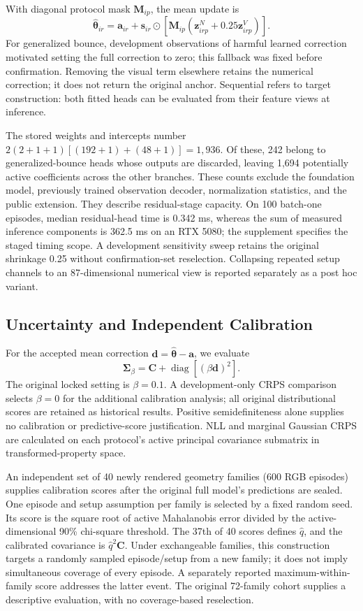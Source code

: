 \documentclass{ieeeaccess}
\begin{document}
With diagonal protocol mask $\bm M_{ip}$, the mean update is
\begin{equation}
\hat{\bm\theta}_{ir}=\bm a_{ir}+\bm s_{ir}\odot\left[\bm M_{ip}(\bm z^N_{irp}+0.25\bm z^V_{irp})\right].\label{eq:update}
\end{equation}
For generalized bounce, development observations of harmful learned correction motivated setting the full correction to zero; this fallback was fixed before confirmation. Removing the visual term elsewhere retains the numerical correction; it does not return the original anchor. Sequential refers to target construction: both fitted heads can be evaluated from their feature views at inference.

The stored weights and intercepts number $2(2+1+1)[(192+1)+(48+1)]=1,936$. Of these, 242 belong to generalized-bounce heads whose outputs are discarded, leaving 1,694 potentially active coefficients across the other branches. These counts exclude the foundation model, previously trained observation decoder, normalization statistics, and the public extension. They describe residual-stage capacity. On 100 batch-one episodes, median residual-head time is 0.342 ms, whereas the sum of measured inference components is 362.5 ms on an RTX 5080; the supplement specifies the staged timing scope. A development sensitivity sweep retains the original shrinkage 0.25 without confirmation-set reselection. Collapsing repeated setup channels to an 87-dimensional numerical view is reported separately as a post hoc variant.

\subsection{Uncertainty and Independent Calibration}
For the accepted mean correction $\bm d=\hat{\bm\theta}-\bm a$, we evaluate
\begin{equation}
\bm\Sigma_\beta=\bm C+\operatorname{diag}[(\beta\bm d)^2].\label{eq:cov}
\end{equation}
The original locked setting is $\beta=0.1$. A development-only CRPS comparison selects $\beta=0$ for the additional calibration analysis; all original distributional scores are retained as historical results. Positive semidefiniteness alone supplies no calibration or predictive-score justification. NLL and marginal Gaussian CRPS are calculated on each protocol's active principal covariance submatrix in transformed-property space.

An independent set of 40 newly rendered geometry families (600 RGB episodes) supplies calibration scores after the original full model's predictions are sealed. One episode and setup assumption per family is selected by a fixed random seed. Its score is the square root of active Mahalanobis error divided by the active-dimensional 90\% chi-square threshold. The 37th of 40 scores defines $\hat q$, and the calibrated covariance is $\hat q^2\bm C$. Under exchangeable families, this construction targets a randomly sampled episode/setup from a new family; it does not imply simultaneous coverage of every episode. A separately reported maximum-within-family score addresses the latter event. The original 72-family cohort supplies a descriptive evaluation, with no coverage-based reselection.
\end{document}
